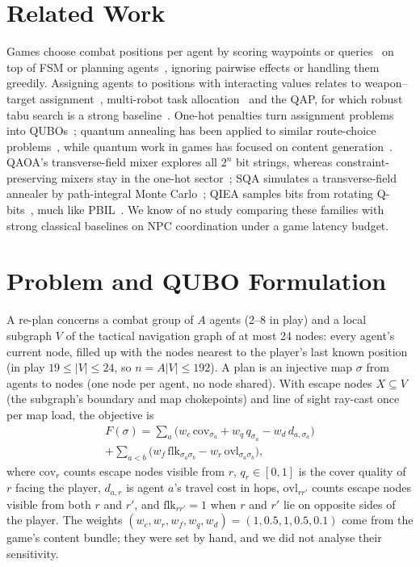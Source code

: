 \documentclass[sigconf]{acmart}
\begin{document}
\section{Related Work}

Games choose combat positions per agent by scoring waypoints or queries~\cite{Straatman2005,Jack2013}
on top of FSM or planning agents~\cite{Orkin2006,Yannakakis2018}, ignoring pairwise effects or
handling them greedily. Assigning agents to positions with interacting values relates to
weapon--target assignment~\cite{Ahuja2007}, multi-robot task allocation~\cite{Gerkey2004} and the
QAP, for which robust tabu search is a strong baseline~\cite{Taillard1991,Loiola2007}. One-hot
penalties turn assignment problems into QUBOs~\cite{Lucas2014,Glover2019}; quantum annealing has
been applied to similar route-choice problems~\cite{Neukart2017}, while quantum work in games has
focused on content generation~\cite{Wootton2020}. QAOA's transverse-field mixer explores all $2^n$
bit strings, whereas constraint-preserving mixers stay in the one-hot sector~\cite{Hadfield2019,Wang2020XY};
SQA simulates a transverse-field annealer by path-integral Monte Carlo~\cite{Martonak2002,Kadowaki1998};
QIEA samples bits from rotating Q-bits~\cite{HanKim2002}, much like PBIL~\cite{Baluja1994}. We know of
no study comparing these families with strong classical baselines on NPC coordination under a game
latency budget.

\section{Problem and QUBO Formulation}

A re-plan concerns a combat group of $A$ agents (2--8 in play) and a local subgraph $V$ of the
tactical navigation graph of at most 24 nodes: every agent's current node, filled up with the
nodes nearest to the player's last known position (in play $19 \le |V| \le 24$, so $n=A|V|\le192$). A plan is an injective map
$\sigma$ from agents to nodes (one node per agent, no node shared). With escape nodes $X \subseteq V$
(the subgraph's boundary and map chokepoints) and line of sight ray-cast once per map load, the
objective is
\begin{multline}\label{eq:F}
F(\sigma) = \sum_a \big(w_c\,\mathrm{cov}_{\sigma_a} + w_q\, q_{\sigma_a} - w_d\, d_{a,\sigma_a}\big)\\
 + \sum_{a<b} \big(w_f\,\mathrm{flk}_{\sigma_a\sigma_b} - w_r\,\mathrm{ovl}_{\sigma_a\sigma_b}\big),
\end{multline}
where $\mathrm{cov}_r$ counts escape nodes visible from $r$, $q_r \in [0,1]$ is the cover quality of
$r$ facing the player, $d_{a,r}$ is agent $a$'s travel cost in hops, $\mathrm{ovl}_{rr'}$ counts escape
nodes visible from both $r$ and $r'$, and $\mathrm{flk}_{rr'}=1$ when $r$ and $r'$ lie on opposite
sides of the player. The weights $(w_c,w_r,w_f,w_q,w_d)=(1,0.5,1,0.5,0.1)$ come from the game's
content bundle; they were set by hand, and we did not analyse their sensitivity.
\end{document}
